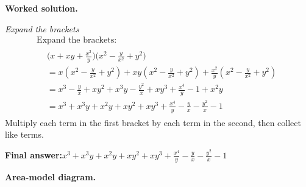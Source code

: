 \documentclass[11pt]{article}
\begin{document}
\textbf{Worked solution.}

\textit{Expand the brackets}
\[\begin{gathered}
\text{Expand the brackets:} \\[1em] \begin{aligned} &\Big(x+xy+\frac{x^2}{y}\Big)\Big(x^2-\frac{y}{x^2}+y^2\Big) \\ &= x\left(x^2-\frac{y}{x^2}+y^2\right) + xy\left(x^2-\frac{y}{x^2}+y^2\right) + \frac{x^2}{y}\left(x^2-\frac{y}{x^2}+y^2\right) \\ &= x^3-\frac{y}{x}+xy^2 + x^3y-\frac{y^2}{x}+xy^3 + \frac{x^4}{y}-1+x^2y \\ &= x^3 + x^3y + x^2y + xy^2 + xy^3 + \frac{x^4}{y} - \frac{y}{x} - \frac{y^2}{x} - 1 \end{aligned}
\end{gathered}\]
Multiply each term in the first bracket by each term in the second, then collect like terms.

\begin{answerbox}
\textbf{Final answer:}\quad \(\displaystyle x^3 + x^3y + x^2y + xy^2 + xy^3 + \frac{x^4}{y} - \frac{y}{x} - \frac{y^2}{x} - 1\)
\end{answerbox}
\textbf{Area-model diagram.}
\end{document}

